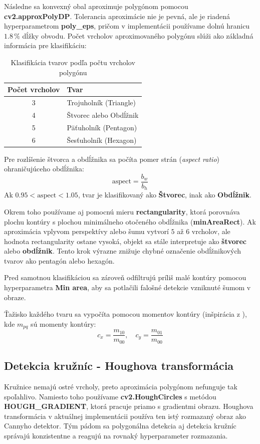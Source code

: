 \documentclass[a4paper, 12pt]{article}
\begin{document}
Následne sa konvexný obal aproximuje polygónom pomocou \textbf{cv2.approxPolyDP}. Tolerancia aproximácie nie je pevná, ale je riadená hyperparametrom \textbf{poly\_eps}, pričom v implementácii používame dolnú hranicu $1.8\,\%$ dĺžky obvodu. Počet vrcholov aproximovaného polygónu slúži ako základná informácia pre klasifikáciu:

\begin{table}[h]
\centering
\begin{tabular}{|c|l|}
\hline
\textbf{Počet vrcholov} & \textbf{Tvar} \\ \hline
3 & Trojuholník (Triangle) \\ \hline
4 & Štvorec alebo Obdĺžnik \\ \hline
5 & Päťuholník (Pentagon) \\ \hline
6 & Šesťuholník (Hexagon) \\ \hline
\end{tabular}
\caption{Klasifikácia tvarov podľa počtu vrcholov polygónu}
\end{table}

Pre rozlíšenie štvorca a obdĺžnika sa počíta pomer strán (\textit{aspect ratio}) ohraničujúceho obdĺžnika:
\[
\text{aspect} = \frac{b_w}{b_h}
\]
Ak $0.95 < \text{aspect} < 1.05$, tvar je klasifikovaný ako \textbf{Štvorec}, inak ako \textbf{Obdĺžnik}.

Okrem toho používame aj pomocnú mieru \textbf{rectangularity}, ktorá porovnáva plochu kontúry s plochou minimálneho otočeného obdĺžnika (\textbf{minAreaRect}). Ak aproximácia vplyvom perspektívy alebo šumu vytvorí $5$ až $6$ vrcholov, ale hodnota rectangularity ostane vysoká, objekt sa stále interpretuje ako \textbf{štvorec} alebo \textbf{obdĺžnik}. Tento krok výrazne znižuje chybné označenie obdĺžnikových tvarov ako pentagón alebo hexagón.

Pred samotnou klasifikáciou sa zároveň odfiltrujú príliš malé kontúry pomocou hyperparametra \textbf{Min area}, aby sa potlačili falošné detekcie vzniknuté šumom v obraze.

Ťažisko každého tvaru sa vypočíta pomocou momentov kontúry (inšpirácia z \cite{moments}), kde $m_{pq}$ sú momenty kontúry:
\[
c_x = \frac{m_{10}}{m_{00}}, \quad c_y = \frac{m_{01}}{m_{00}}
\]

\subsection{Detekcia kružníc - Houghova transformácia}
Kružnice nemajú ostré vrcholy, preto aproximácia polygónom nefunguje tak spoľahlivo. Namiesto toho používame \textbf{cv2.HoughCircles} s metódou \textbf{HOUGH\_GRADIENT}, ktorá pracuje priamo s gradientmi obrazu.
Houghova transformácia v aktuálnej implementácii používa ten istý rozmazaný obraz ako Cannyho detektor. Tým pádom sa polygonálna detekcia aj detekcia kružníc správajú konzistentne a reagujú na rovnaký hyperparameter rozmazania.
\end{document}
